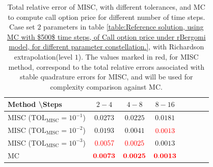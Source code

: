 \begin{table}[h!]
	\centering
	\begin{tabular}{l*{6}{c}r}
		Method \textbackslash  Steps           & $2-4$ & $4-8$ & $8-16$  \\
		\hline
		MISC ($\text{TOL}_{\text{MISC}}=10^{-1}$)  &$0.0273$  &$0.0225$ & $0.0181$  \\
			MISC ($\text{TOL}_{\text{MISC}}=10^{-2}$)  & $0.0193$  & $0.0041$ & ${\color{red}0.0013}$  \\
		MISC ($\text{TOL}_{\text{MISC}}=10^{-3}$)  & ${\color{red}0.0057}$  & ${\color{red}0.0025}$ & $0.0013$  \\
	\hline

		MC    & ${\color{red}\mathbf{0.0073}}$  &   ${\color{red}\mathbf{0.0025}}$  &  ${\color{red}\mathbf{0.0013}}$  \\
		\hline
	\end{tabular}
	\caption{Total relative error of MISC, with different tolerances, and MC to compute call option price  for different number of time steps. Case set $2$ parameters in table \ref{table:Reference solution, using MC with $500$ time steps, of Call option price under rBergomi model, for different parameter constellation.}, with Richardson extrapolation(level $1$). The values marked in red, for MISC method, correspond to the total relative errors associated with  stable quadrature errors for MISC, and will be used for complexity comparison against MC.}
	\label{Total  error of MISC and MC to compute Call option price of the different tolerances for different number of time steps. Case set $3$ parameters, with Richardson extrapolation(level $1$). The numbers between parentheses are the corresponding absolute errors.}
\end{table}

\FloatBarrier

